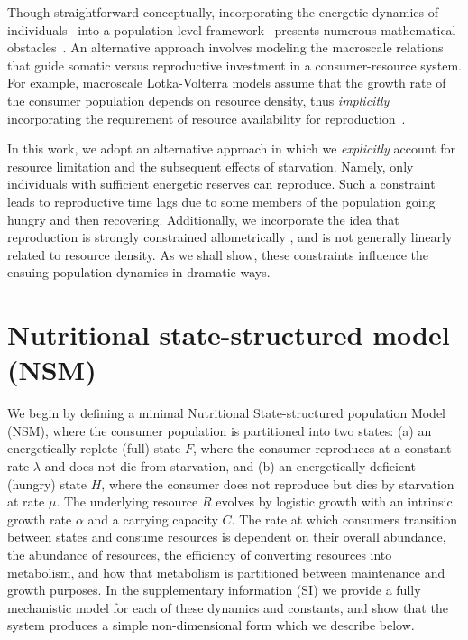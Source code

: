 \documentclass[twocolumn,preprintnumbers,amsmath,amssymb,superscriptaddress]{revtex4}
\begin{document}
\begin{bibunit}[unsrt]
Though straightforward conceptually, incorporating the energetic dynamics of individuals~\cite{Kooi2000} into a population-level framework~\cite{Kooi2000,Sousa:2010ez} presents numerous mathematical obstacles~\cite{Diekmann:2010da}.
An alternative approach involves modeling the macroscale relations that guide somatic versus reproductive investment in a consumer-resource system.
For example, macroscale Lotka-Volterra models assume that the growth rate of the consumer population depends on resource density, thus \emph{implicitly} incorporating the requirement of resource availability for reproduction~\cite{murdoch:2003}.

In this work, we adopt an alternative approach in which we \emph{explicitly} account for resource limitation and the subsequent effects of starvation.
Namely, only individuals with sufficient energetic reserves can reproduce.
Such a constraint leads to reproductive time lags due to some members of the population going hungry and then recovering.
Additionally, we incorporate the idea that reproduction is strongly constrained allometrically \cite{Kempes:2012hy}, and is not generally linearly related to resource density.
As we shall show, these constraints influence the ensuing population dynamics in dramatic ways.
\\

\section*{Nutritional state-structured model (NSM)}
We begin by defining a minimal Nutritional State-structured population Model (NSM), where the consumer population is partitioned into two states: (a) an energetically replete (full) state $F$, where the consumer reproduces at a constant rate $\lambda$ and does not die from starvation, and (b) an energetically deficient (hungry) state $H$, where the consumer does not reproduce but dies by starvation at rate $\mu$. The underlying resource $R$ evolves by logistic growth with an intrinsic growth rate $\alpha$ and a carrying capacity $C$. The rate at which consumers transition between states and consume resources is dependent on their overall abundance, the abundance of resources, the efficiency of converting resources into metabolism, and how that metabolism is partitioned between maintenance and growth purposes. In the supplementary information (SI) we provide a fully mechanistic model for each of these dynamics and constants, and show that the system produces a simple non-dimensional form which we describe below.


\end{bibunit}
\end{document}

